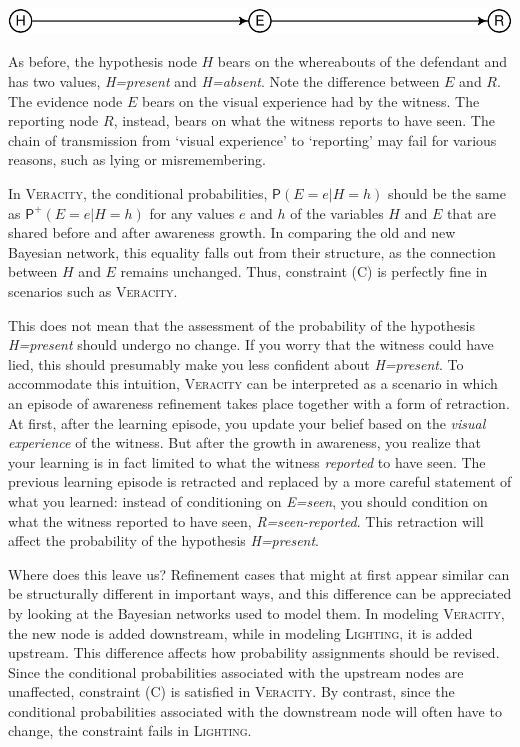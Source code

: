 \documentclass[
  11pt,
  dvipsnames,enabledeprecatedfontcommands]{scrartcl}
\newcommand{\pr}[1]{\ensuremath{\mathsf{P}(#1)}}
\newcommand{\ppr}[2]{\ensuremath{\mathsf{P}^{#1}(#2)}}
\begin{document}
\begin{center}\includegraphics[width=0.5\linewidth,height=0.3\textheight]{ReplyToSteeleStefansson5_files/figure-latex/veracityDAG-1} \end{center}

\noindent As before, the hypothesis node \(H\) bears on the whereabouts
of the defendant and has two values, \textit{H=present} and
\textit{H=absent}. Note the difference between \(E\) and \(R\). The
evidence node \(E\) bears on the visual experience had by the witness.
The reporting node \(R\), instead, bears on what the witness reports to
have seen. The chain of transmission from `visual experience' to
`reporting' may fail for various reasons, such as lying or
misremembering.

In \textsc{Veracity}, the conditional probabilities,
\(\pr{E=e \vert H=h}\) should be the same as \(\ppr{+}{E=e \vert H=h}\)
for any values \(e\) and \(h\) of the variables \(H\) and \(E\) that are
shared before and after awareness growth. In comparing the old and new
Bayesian network, this equality falls out from their structure, as the
connection between \(H\) and \(E\) remains unchanged. Thus, constraint
(C) is perfectly fine in scenarios such as \textsc{Veracity}.

This does not mean that the assessment of the probability of the
hypothesis \textit{H=present} should undergo no change. If you worry
that the witness could have lied, this should presumably make you less
confident about \textit{H=present}. To accommodate this intuition,
\textsc{Veracity} can be interpreted as a scenario in which an episode
of awareness refinement takes place together with a form of retraction.
At first, after the learning episode, you update your belief based on
the \textit{visual experience} of the witness. But after the growth in
awareness, you realize that your learning is in fact limited to what the
witness \textit{reported} to have seen. The previous learning episode is
retracted and replaced by a more careful statement of what you learned:
instead of conditioning on \textit{E=seen}, you should condition on what
the witness reported to have seen, \textit{R=seen-reported}. This
retraction will affect the probability of the hypothesis
\textit{H=present}.

Where does this leave us? Refinement cases that might at first appear
similar can be structurally different in important ways, and this
difference can be appreciated by looking at the Bayesian networks used
to model them. In modeling \textsc{Veracity}, the new node is added
downstream, while in modeling \textsc{Lighting}, it is added upstream.
This difference affects how probability assignments should be revised.
Since the conditional probabilities associated with the upstream nodes
are unaffected, constraint (C) is satisfied in \textsc{Veracity}. By
contrast, since the conditional probabilities associated with the
downstream node will often have to change, the constraint fails in
\textsc{Lighting}.
\end{document}
